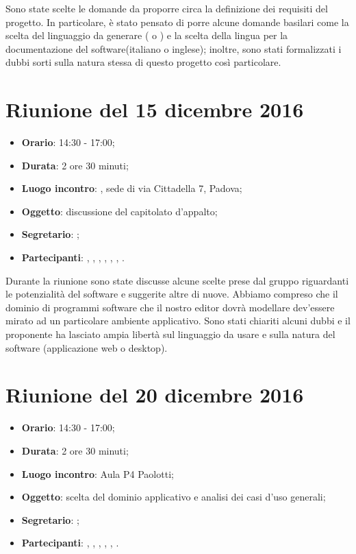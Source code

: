 Sono state scelte le domande da proporre circa la definizione dei requisiti del progetto. In particolare, è stato pensato di porre alcune domande basilari come la scelta del linguaggio da generare ( o ) e la scelta della lingua per la documentazione del software(italiano o inglese); inoltre, sono stati formalizzati i dubbi sorti sulla natura stessa di questo progetto così particolare.



\section{Riunione del 15 dicembre 2016}

\begin{itemize}
	\item \textbf{Orario}: 14:30 - 17:00;
	\item \textbf{Durata}: 2 ore 30 minuti;
	\item \textbf{Luogo incontro}: \ZU, sede di via Cittadella 7, Padova; 
	\item \textbf{Oggetto}: discussione del capitolato d'appalto;
	\item \textbf{Segretario}: \LS; 
	\item \textbf{Partecipanti}: \GP, \AZ, \GG, \LB, \LS, \MM, \PB.
\end{itemize}

Durante la riunione sono state discusse alcune scelte prese dal gruppo riguardanti le potenzialità del software e suggerite altre di nuove. Abbiamo compreso che il dominio di programmi software che il nostro editor dovrà modellare dev'essere mirato ad un particolare ambiente applicativo. Sono stati chiariti alcuni dubbi e il proponente ha lasciato ampia libertà sul linguaggio da usare e sulla natura del software (applicazione web o desktop).



\section{Riunione del 20 dicembre 2016}

\begin{itemize}
	\item \textbf{Orario}: 14:30 - 17:00;
	\item \textbf{Durata}: 2 ore 30 minuti;
	\item \textbf{Luogo incontro}: Aula P4 Paolotti; 
	\item \textbf{Oggetto}: scelta del dominio applicativo e analisi dei casi d'uso generali;
	\item \textbf{Segretario}: \PB; 
	\item \textbf{Partecipanti}: \AZ, \GG, \LB, \LS, \MM, \PB.
\end{itemize}

